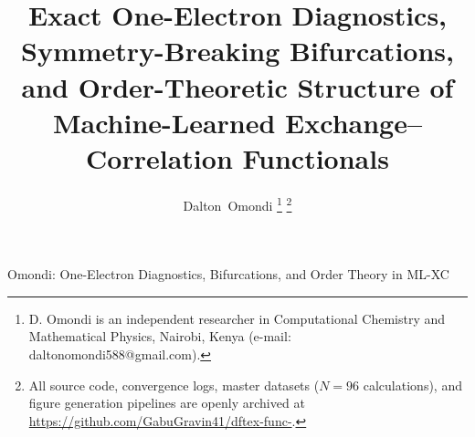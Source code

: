 \documentclass[journal]{IEEEtran}
\begin{document}
\title{Exact One-Electron Diagnostics, Symmetry-Breaking Bifurcations, and Order-Theoretic Structure of Machine-Learned Exchange--Correlation Functionals}

\author{Dalton~Omondi%
\thanks{D. Omondi is an independent researcher in Computational Chemistry and Mathematical Physics, Nairobi, Kenya (e-mail: daltonomondi588@gmail.com).}%
\thanks{All source code, convergence logs, master datasets ($N=96$ calculations), and figure generation pipelines are openly archived at \protect\url{https://github.com/GabuGravin41/dftex-func-}.}
}

%
{Omondi: One-Electron Diagnostics, Bifurcations, and Order Theory in ML-XC}

\maketitle
\end{document}
